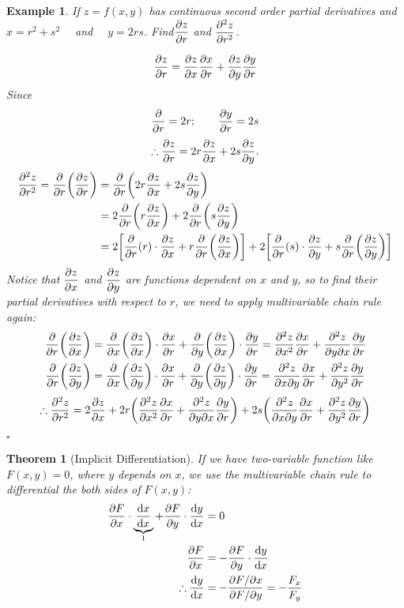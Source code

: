 \documentclass[12pt,a4paper]{article}
\newtheorem{thm}{Theorem}[subsection]
\newtheorem{eg}{Example}[subsection]
\newenvironment*{ans}{\par\indent{\textit{Answer. }}\par}{\par\hfill{$\square$}\par}
\def\d{{\mathrm{d}}}
\def\dydx{\displaystyle\frac{\d y}{\d x}}
\def\dx{\d x}
\def\del{\partial}
\begin{document}
\begin{eg}
	If $z=f(x,y)$ has continuous second order partial derivatives and $x=r^2+s^2\quad$ and $\quad y=2rs$. Find$\displaystyle\pdv{z}{r}$ and $\displaystyle\pdv[2]{z}{r}$.
	\begin{ans}
		\[\pdv{z}{r}=\pdv{z}{x}\pdv{x}{r}+\pdv{z}{y}\pdv{y}{r}\] Since \[\pdv{}{r}=2r;\qquad\pdv{y}{r}=2s\]\[\therefore\pdv{z}{r}=2r\pdv{z}{x}+2s\pdv{z}{y}.\]\[\begin{aligned}\pdv[2]{z}{r}=\pdv{}{r}\qty(\pdv{z}{r})&=\pdv{}{r}\qty(2r\pdv{z}{x}+2s\pdv{z}{y})\\&=2\pdv{}{r}\qty(r\pdv{z}{x})+2\pdv{}{r}\qty(s\pdv{z}{y})\\&=2\qty[\pdv{}{r}\qty(r)\cdot\pdv{z}{x}+r\pdv{}{r}\qty(\pdv{z}{x})]+2\qty[\pdv{}{r}\qty(s)\cdot\pdv{z}{y}+s\pdv{}{r}\qty(\pdv{z}{y})]\end{aligned}\] Notice that $\displaystyle\pdv{z}{x}$ and $\displaystyle\pdv{z}{y}$ are functions dependent on $x$ and $y$, so to find their partial derivatives with respect to $r$, we need to apply multivariable chain rule again: \[\begin{aligned}\pdv{}{r}\qty(\pdv{z}{x})&=\pdv{}{x}\qty(\pdv{z}{x})\cdot\pdv{x}{r}+\pdv{}{y}\qty(\pdv{z}{x})\cdot\pdv{y}{r}=\pdv[2]{z}{x}\pdv{x}{r}+\pdv{z}{y}{x}\pdv{y}{r}\\\pdv{}{r}\qty(\pdv{z}{y})&=\pdv{}{x}\qty(\pdv{z}{y})\cdot\pdv{x}{r}+\pdv{}{y}\qty(\pdv{z}{y})\cdot\pdv{y}{r}=\pdv{z}{x}{y}\pdv{x}{r}+\pdv[2]{z}{y}\pdv{y}{r}\end{aligned}\]\[\therefore\pdv[2]{z}{r}=2\pdv{z}{x}+2r\qty(\pdv[2]{z}{x}\pdv{x}{r}+\pdv{z}{y}{x}\pdv{y}{r})+2s\qty(\pdv{z}{x}{y}\pdv{x}{r}+\pdv[2]{z}{y}\pdv{y}{r})\]
	\end{ans}
\end{eg}
\begin{thm}[Implicit Differentiation]
	If we have two-variable function like $F(x,y)=0$, where $y$ depends on $x$, we use the multivariable chain rule to differential the both sides of $F(x,y)$:
	\[\begin{aligned}\pdv{F}{x}\cdot\underbrace{\frac{\dx}{\dx}}_{1}+\pdv{F}{y}\cdot\dydx&=0\\\pdv{F}{x}&=-\pdv{F}{y}\cdot\dydx\\\therefore\dydx&=-\frac{{\del F}/{\del x}}{{\del F}/{\del y}}=-\frac{F_x}{F_y}\end{aligned}\]	
\end{thm}
\end{document}
